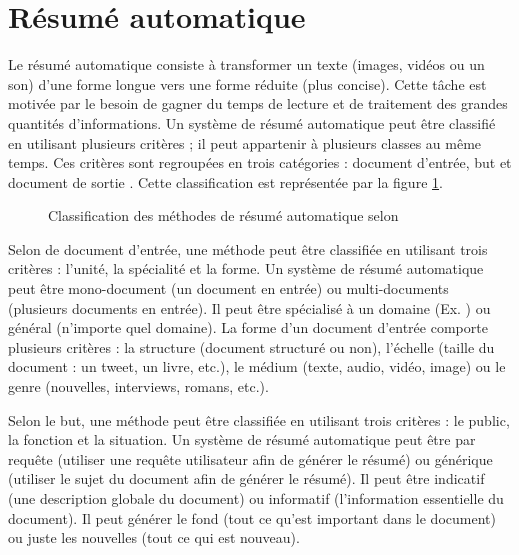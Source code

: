 \documentclass{KodeBook}
\begin{document}
\section{Résumé automatique}

Le résumé automatique consiste à transformer un texte (images, vidéos ou un son) d'une forme longue vers une forme réduite (plus concise).
Cette tâche est motivée par le besoin de gagner du temps de lecture et de traitement des grandes quantités d'informations.
Un système de résumé automatique peut être classifié en utilisant plusieurs critères ; il peut appartenir à plusieurs classes au même temps.
Ces critères sont regroupées en trois catégories : document d'entrée, but et document de sortie \cite{98-hovy-lin,99-sparckjones}.
Cette classification est représentée par la figure \ref{fig:ats-class}.

\begin{figure}[ht]
	\centering
	\caption[Classification des méthodes de résumé automatique]{Classification des méthodes de résumé automatique selon \citet{98-hovy-lin,99-sparckjones}}
	\label{fig:ats-class}
\end{figure}

Selon de document d'entrée, une méthode peut être classifiée en utilisant trois critères : l'unité, la spécialité et la forme. 
Un système de résumé automatique peut être mono-document (un document en entrée) ou multi-documents (plusieurs documents en entrée). 
Il peut être spécialisé à un domaine (Ex. ) ou général (n'importe quel domaine).
La forme d'un document d'entrée comporte plusieurs critères : la structure (document structuré ou non), l'échelle (taille du document : un tweet, un livre, etc.), le médium (texte, audio, vidéo, image) ou le genre (nouvelles, interviews, romans, etc.).

Selon le but, une méthode peut être classifiée en utilisant trois critères : le public, la fonction et la situation. 
Un système de résumé automatique peut être par requête (utiliser une requête utilisateur afin de générer le résumé) ou générique (utiliser le sujet du document afin de générer le résumé).
Il peut être indicatif (une description globale du document) ou informatif (l'information essentielle du document). 
Il peut générer le fond (tout ce qu'est important dans le document) ou juste les nouvelles (tout ce qui est nouveau).
\end{document}
